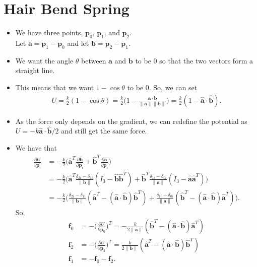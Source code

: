 \documentclass[10pt]{article}
\newcommand{\ve}[1]{\mathbf{#1}}
\begin{document}
  \section{Hair Bend Spring}
  \begin{itemize}
    \item We have three points, $\ve{p}_0$, $\ve{p}_1$, and $\ve{p}_2$.\\
     Let $\ve{a} = \ve{p}_1 - \ve{p}_0$ and let $\ve{b} = \ve{p}_2 - \ve{p}_1$.

     \item We want the angle $\theta$ between $\ve{a}$ and $\ve{b}$ to be $0$ so that the two vectors form a straight line. 

     \item This means that we want $1 - \cos \theta$ to be 0. So, we can set
     \begin{align*}
       U 
       = \frac{k}{2} (1 - \cos\theta) 
       = \frac{k}{2}\bigg( 1 - \frac{\ve{a} \cdot \ve{b}}{\| \ve{a} \| \| \ve{b} \| } \bigg)
       = \frac{k}{2}( 1 - \widehat{\ve{a}} \cdot \widehat{\ve{b}}).
     \end{align*}

     \item As the force only depends on the gradient, we can redefine the potential as $U = -k \widehat{\ve{a}} \cdot \widehat{\ve{b}}/2$ and still get the same force.

     \item We have that
     \begin{align*}
       \frac{\partial U}{\partial \ve{p}_i} 
       &= -\frac{k}{2}\bigg( \widehat{\ve{a}}^T \frac{\partial \widehat{\ve{b}}}{\partial \ve{p}_i} + \widehat{\ve{b}}^T \frac{\partial \widehat{\ve{a}}}{\partial \ve{p}_i} \bigg)\\
       &= -\frac{k}{2} \bigg( \widehat{\ve{a}}^T \frac{\delta_{2i} - \delta_{1i}}{\| \ve{b} \| } (I_3 - \widehat{\ve{b}}\widehat{\ve{b}}^T) 
       + \widehat{\ve{b}}^T \frac{\delta_{1i} - \delta_{0i}}{\| \ve{a} \| } (I_3 - \widehat{\ve{a}}\widehat{\ve{a}}^T) \bigg)\\
       &= -\frac{k}{2} \bigg( \frac{\delta_{2i} - \delta_{1i}}{\| \ve{b} \| } (\widehat{\ve{a}}^T - (\widehat{\ve{a}} \cdot \widehat{\ve{b}}) \widehat{\ve{b}}^T) 
       + \frac{\delta_{1i} - \delta_{0i}}{\| \ve{a} \| } (\widehat{\ve{b}}^T - (\widehat{\ve{a}} \cdot \widehat{\ve{b}}) \widehat{\ve{a}}^T) \bigg).
     \end{align*}
     So,
     \begin{align*}
       \ve{f}_0 &= - \bigg( \frac{\partial U}{\partial \ve{p}_0} \bigg)^T = -\frac{k}{2 \| \ve{a} \|} (\widehat{\ve{b}}^T - (\widehat{\ve{a}} \cdot \widehat{\ve{b}}) \widehat{\ve{a}}^T) \\
       \ve{f}_2 &= - \bigg( \frac{\partial U}{\partial \ve{p}_2} \bigg)^T = \frac{k}{2 \| \ve{b} \|} (\widehat{\ve{a}}^T - (\widehat{\ve{a}} \cdot \widehat{\ve{b}}) \widehat{\ve{b}}^T)\\
       \ve{f}_1 &= -\ve{f}_0 - \ve{f}_2.
     \end{align*}
  \end{itemize}
\end{document}
